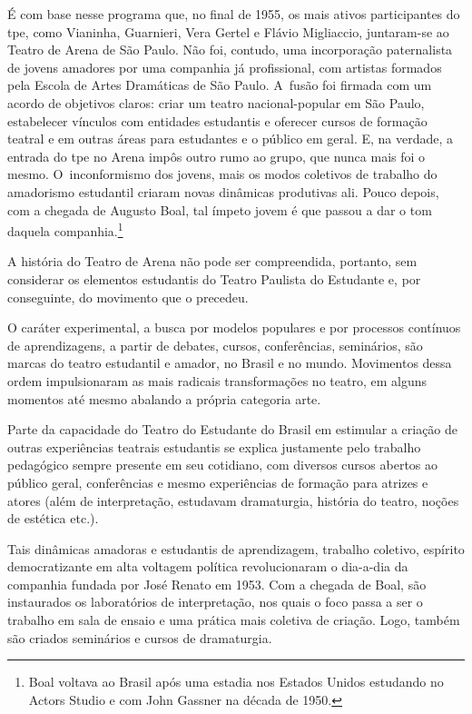 {É com base nesse programa que, no final de 1955, os mais ativos
participantes do {\sc tpe}, como Vianinha, Guarnieri, Vera Gertel e Flávio
Migliaccio, juntaram-se ao Teatro de Arena de São Paulo. Não foi,
contudo, uma incorporação paternalista de jovens amadores por uma
companhia já profissional, com artistas formados pela Escola de Artes
Dramáticas de São Paulo. A~fusão foi firmada com um acordo de objetivos
claros: criar um teatro nacional-popular em São Paulo, estabelecer
vínculos com entidades estudantis e oferecer cursos de formação teatral
e em outras áreas para estudantes e o público em geral. E, na verdade, a
entrada do {\sc tpe} no Arena impôs outro rumo ao grupo, que nunca mais foi o
mesmo. O~inconformismo dos jovens, mais os modos coletivos de trabalho
do amadorismo estudantil criaram novas dinâmicas produtivas ali. Pouco
depois, com a chegada de Augusto Boal, tal ímpeto jovem é que passou a
dar o tom daquela companhia.\footnote{Boal voltava ao Brasil após uma
  estadia nos Estados Unidos estudando no Actors Studio e com John
  Gassner na década de 1950.}

\subject{Efervescência política e cultural dos anos 1960}

A história do Teatro de Arena não pode ser compreendida, portanto, sem
considerar os elementos estudantis do Teatro Paulista do Estudante e,
por conseguinte, do movimento que o precedeu.

O caráter experimental, a busca por modelos populares e por processos
contínuos de aprendizagens, a partir de debates, cursos, conferências,
seminários, são marcas do teatro estudantil e amador, no Brasil e no
mundo. Movimentos dessa ordem impulsionaram as mais radicais
transformações no teatro, em alguns momentos até mesmo abalando a
própria categoria arte.

Parte da capacidade do Teatro do Estudante do Brasil em estimular a
criação de outras experiências teatrais estudantis se explica justamente
pelo trabalho pedagógico sempre presente em seu cotidiano, com diversos
cursos abertos ao público geral, conferências e mesmo experiências de
formação para atrizes e atores (além de interpretação, estudavam
dramaturgia, história do teatro, noções de estética etc.).

Tais dinâmicas amadoras e estudantis de aprendizagem, trabalho coletivo,
espírito democratizante em alta voltagem política revolucionaram o
dia-a-dia da companhia fundada por José Renato em 1953. Com a chegada de
Boal, são instaurados os laboratórios de interpretação, nos quais o foco
passa a ser o trabalho em sala de ensaio e uma prática mais coletiva de
criação. Logo, também são criados seminários e cursos de dramaturgia.

}

